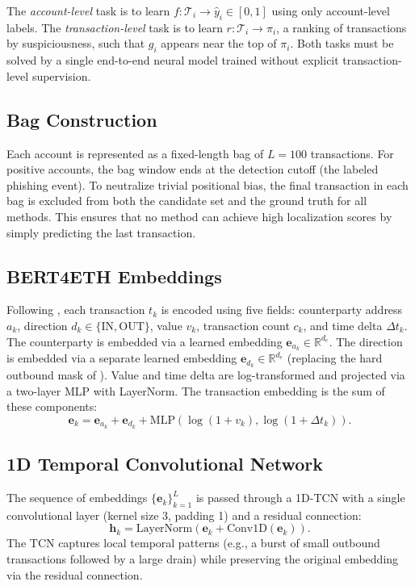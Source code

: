 \documentclass[conference]{IEEEtran}
\begin{document}
The \emph{account-level} task is to learn $f : \mathcal{T}_i \rightarrow \hat{y}_i \in [0, 1]$ using only account-level labels. The \emph{transaction-level} task is to learn $r : \mathcal{T}_i \rightarrow \pi_i$, a ranking of transactions by suspiciousness, such that $g_i$ appears near the top of $\pi_i$. Both tasks must be solved by a single end-to-end neural model trained without explicit transaction-level supervision.

\subsection{Bag Construction}
Each account is represented as a fixed-length bag of $L=100$ transactions. For positive accounts, the bag window ends at the detection cutoff (the labeled phishing event). To neutralize trivial positional bias, the final transaction in each bag is excluded from both the candidate set and the ground truth for all methods. This ensures that no method can achieve high localization scores by simply predicting the last transaction.

\subsection{BERT4ETH Embeddings}
Following \cite{bert4eth}, each transaction $t_k$ is encoded using five fields: counterparty address $a_k$, direction $d_k \in \{\text{IN}, \text{OUT}\}$, value $v_k$, transaction count $c_k$, and time delta $\Delta t_k$. The counterparty is embedded via a learned embedding $\mathbf{e}_{a_k} \in \mathbb{R}^{d_e}$. The direction is embedded via a separate learned embedding $\mathbf{e}_{d_k} \in \mathbb{R}^{d_e}$ (replacing the hard outbound mask of \cite{bert4eth}). Value and time delta are log-transformed and projected via a two-layer MLP with LayerNorm. The transaction embedding is the sum of these components:
\begin{equation}
\mathbf{e}_k = \mathbf{e}_{a_k} + \mathbf{e}_{d_k} + \text{MLP}(\log(1 + v_k), \log(1 + \Delta t_k)).
\end{equation}

\subsection{1D Temporal Convolutional Network}
The sequence of embeddings $\{\mathbf{e}_k\}_{k=1}^L$ is passed through a 1D-TCN with a single convolutional layer (kernel size 3, padding 1) and a residual connection:
\begin{equation}
\mathbf{h}_k = \text{LayerNorm}(\mathbf{e}_k + \text{Conv1D}(\mathbf{e}_k)).
\end{equation}
The TCN captures local temporal patterns (e.g., a burst of small outbound transactions followed by a large drain) while preserving the original embedding via the residual connection.
\end{document}
